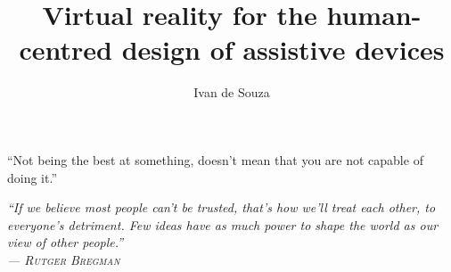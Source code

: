 \documentclass[msc, eng]{ita}    %
\author{Ivan de Souza}{Rehder}
\title{Virtual reality for the human-centred design of assistive devices}
\date{}{}{}
\begin{document}
\maketitle

\begin{itadedication}
    “Not being the best at something, doesn't mean that you are not capable of doing it.”\\
\end{itadedication}

\begin{itathanks}

\end{itathanks}

\thispagestyle{empty}
\ifhyperref{}\fi
\begin{flushright}
\begin{spacing}{1}
\mbox{}\vfill
{\sffamily\itshape
“If we believe most people can't be trusted, that's how we'll treat each other, to everyone's detriment. Few ideas have as much power to shape the world as our view of other people.”\\
    --- \textsc{Rutger Bregman}
}
\end{spacing}
\end{flushright}

% 

\begin{englishabstract}
\noindent

\end{englishabstract}

\listoffigures %

\listoftables %

\listofabbreviations
\end{document}
